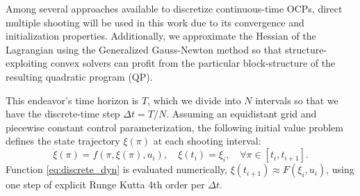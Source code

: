 Among several approaches available to discretize continuous-time OCPs, direct multiple shooting \cite{bock1984} will be used in this work due to its convergence and initialization properties. Additionally, we approximate the Hessian of the Lagrangian using the Generalized Gauss-Newton method so that structure-exploiting convex solvers can profit from the particular block-structure of the resulting quadratic program (QP).  

This endeavor's time horizon is $T$, which we divide into $N$ intervals so that we have the discrete-time step $\Delta t = T/N$. Assuming an equidistant grid and piecewise constant control parameterization, the following initial value problem defines the state trajectory $\xi(\pi)$ at each shooting interval:
\begin{equation}
	\dot{\xi}(\pi) = f(\pi,\xi(\pi),u_i), \quad \xi(t_i) = \xi_i, \quad \forall \pi \in [t_i, t_{i+1}].\label{eq:discrete_dyn}
\end{equation}
Function \eqref{eq:discrete_dyn} is evaluated numerically, $\xi(t_{i+1}) \approx F(\xi_i,u_i)$, using one step of explicit Runge Kutta 4th order per $\Delta t$.